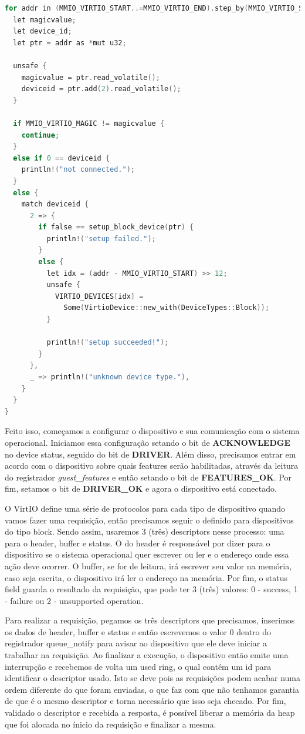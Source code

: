 \begin{lstlisting}[language=C]
for addr in (MMIO_VIRTIO_START..=MMIO_VIRTIO_END).step_by(MMIO_VIRTIO_STRIDE) {
  let magicvalue;
  let device_id;
  let ptr = addr as *mut u32;

  unsafe {
    magicvalue = ptr.read_volatile();
    deviceid = ptr.add(2).read_volatile();
  }

  if MMIO_VIRTIO_MAGIC != magicvalue {
    continue;
  }
  else if 0 == deviceid {
    println!("not connected.");
  }
  else {
    match deviceid {
      2 => {
        if false == setup_block_device(ptr) {
          println!("setup failed.");
        }
        else {
          let idx = (addr - MMIO_VIRTIO_START) >> 12;
          unsafe {
            VIRTIO_DEVICES[idx] =
              Some(VirtioDevice::new_with(DeviceTypes::Block));
          }

          println!("setup succeeded!");
        }
      },
      _ => println!("unknown device type."),
    }
  }
}
\end{lstlisting}

Feito isso, começamos a configurar o dispositivo e sua comunicação com o sistema operacional. Iniciamos essa configuração setando o bit de \textbf{ACKNOWLEDGE} no device status, seguido do bit de \textbf{DRIVER}.
Além disso, precisamos entrar em acordo com o dispositivo sobre quais features serão habilitadas, através da leitura do registrador \emph{guest{\_}features} e então setando o bit de \textbf{FEATURES{\_}OK}. 
Por fim, setamos o bit de \textbf{DRIVER{\_}OK} e agora o dispositivo está conectado.

O VirtIO define uma série de protocolos para cada tipo de dispositivo quando vamos fazer uma requisição, então precisamos seguir o definido para dispositivos do tipo block.
Sendo assim, usaremos 3 (três) descriptors nesse processo: uma para o header, buffer e status.
O do header é responsável por dizer para o dispositivo se o sistema operacional quer escrever ou ler e o endereço onde essa ação deve ocorrer.
O buffer, se for de leitura, irá escrever seu valor na memória, caso seja escrita, o dispositivo irá ler o endereço na memória.
Por fim, o status field guarda o resultado da requisição, que pode ter 3 (três) valores: 0 - success, 1 - failure ou 2 - unsupported operation.


Para realizar a requisição, pegamos os três descriptors que precisamos, inserimos os dados de header, buffer e status e então escrevemos o valor 0 dentro do registrador queue{\_}notify para avisar ao dispositivo que ele deve iniciar a trabalhar na requisição.
Ao finalizar a execução, o dispositivo então emite uma interrupção e recebemos de volta um used ring, o qual contém um id para identificar o descriptor usado. Isto se deve pois as requisições podem 
acabar numa ordem diferente do que foram enviadas, o que faz com que não tenhamos garantia de que é o mesmo descriptor e torna necessário que isso seja checado.
Por fim, validado o descriptor e recebida a resposta, é possível liberar a memória da heap que foi alocada no ínicio da requisição e finalizar a mesma.
